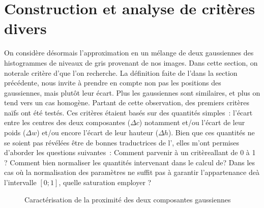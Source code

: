 \documentclass[main.tex]{subfiles}
\begin{document}
\section{Construction et analyse de critères divers}
On considère désormais l'approximation en un mélange de deux gaussiennes des histogrammes de niveaux de gris provenant de nos images. Dans cette section, on notera\HH le critère d'\hetero que l'on recherche. 
La définition faite de l'\hetero dans la section précédente, nous invite à prendre en compte non pas les positions des gaussiennes, mais plutôt leur écart. Plus les gaussiennes sont similaires, et plus on tend vers un cas homogène. Partant de cette observation, 
des premiers critères naïfs ont été testés. Ces critères étaient basés sur des quantités simples~:  l'écart entre les centres des deux composantes ($\Delta c$) notamment et/ou l'écart de leur poids  ($\Delta w$) et/ou encore l'écart de leur hauteur ($\Delta h$). Bien que ces quantités ne se soient pas révélées être de bonnes traductrices de l'\hetero, elles m'ont permises d'aborder les questions suivantes~:
Comment parvenir à un critère\HH allant de 0 à 1 ? Comment bien normaliser les quantités intervenant dans le calcul de\HH ? Dans les cas où la normalisation des paramètres ne suffit pas à garantir l'appartenance de\HH à l'intervalle $[0;1]$, quelle saturation employer ? 

\begin{figure}
\centering
{}\qquad
{}
\caption{Caractérisation de la proximité des deux composantes gaussiennes}
\end{figure}
\end{document}
